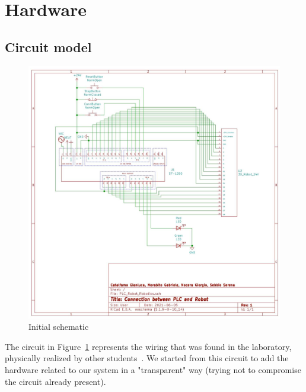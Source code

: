 \documentclass[a4paper,11pt]{report}
\theoremstyle{definition}
\theoremstyle{plain}
\begin{document}
    \section{Hardware}
        \subsection{Circuit model}
            \begin{figure}[H]
                \centering
                \includegraphics[scale=0.5]{images/schema.png}
                \caption{Initial schematic}
                \label{schema}
            \end{figure} 
            The circuit in Figure~\ref{schema} represents the wiring that was found in the laboratory, physically realized by other students~\cite{schematic}. We started from this circuit to add the hardware related to our system in a "transparent" way (trying not to compromise the circuit already present).
\end{document}
